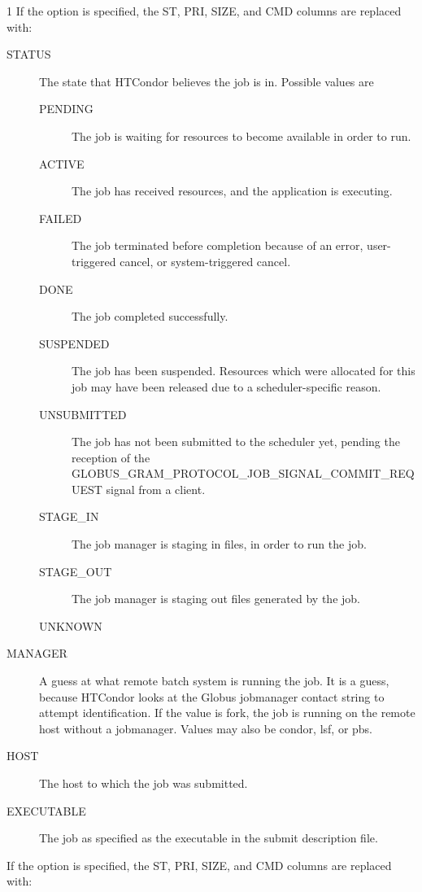 \begin{ManPage}{\label{man-condor-q}}{1}
If the  option is specified, the ST, PRI, SIZE, and CMD
columns are replaced with:
\begin{description}
\item[STATUS] The state that HTCondor believes the job is in.
Possible values are
  \begin{description}
    \item[PENDING] The job is waiting for resources to become available
    in order to run.
    \item[ACTIVE] The job has received resources, and the application
    is executing.
    \item[FAILED] The job terminated before completion because of an error,
    user-triggered cancel, or system-triggered cancel.
    \item[DONE] The job completed successfully.
    \item[SUSPENDED] The job has been suspended.
    Resources which were allocated for this job may have been
    released due to a scheduler-specific reason.
    \item[UNSUBMITTED] The job has not been submitted to the scheduler yet,
    pending the reception of the 
    GLOBUS\_GRAM\_PROTOCOL\_JOB\_SIGNAL\_COMMIT\_REQUEST signal from a client.
    \item[STAGE\_IN] The job manager is staging in files,
    in order to run the job.
    \item[STAGE\_OUT] The job manager is staging out files
    generated by the job.
    \item[UNKNOWN]
  \end{description}
\item[MANAGER] 
A guess at what remote batch system is running the job.
It is a guess, because HTCondor looks at the Globus jobmanager contact
string to attempt identification.
If the value is fork, the job is running on the
remote host without a jobmanager.
Values may also be condor, lsf, or pbs.
\item[HOST] The host to which the job was submitted.
\item[EXECUTABLE] The job as specified as the executable in the
submit description file.
\end{description}

If the  option is specified, the ST, PRI, SIZE, and CMD
columns are replaced with:


\end{ManPage}

